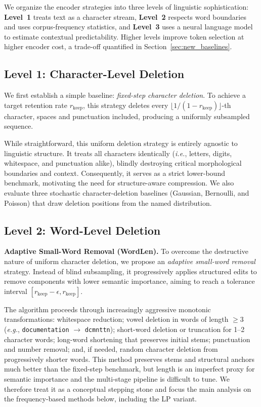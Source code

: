 \documentclass[11pt]{article}
\newcommand{\rkeep}{r_{\mathrm{keep}}}
\begin{document}
We organize the encoder strategies into three levels of linguistic sophistication: \textbf{Level~1} treats text as a character stream, \textbf{Level~2} respects word boundaries and uses corpus-frequency statistics, and \textbf{Level~3} uses a neural language model to estimate contextual predictability. Higher levels improve token selection at higher encoder cost, a trade-off quantified in Section~\ref{sec:new_baselines}.

\subsection*{Level 1: Character-Level Deletion}

\label{sec:step}
We first establish a simple baseline: \textit{fixed-step character deletion}. To achieve a target retention rate $\rkeep$, this strategy deletes every $\lfloor 1/(1-\rkeep) \rfloor$-th character, spaces and punctuation included, producing a uniformly subsampled sequence.

While straightforward, this uniform deletion strategy is entirely agnostic to linguistic structure. It treats all characters identically ({\em i.e.}, letters, digits, whitespace, and punctuation alike), blindly destroying critical morphological boundaries and context. Consequently, it serves as a strict lower-bound benchmark, motivating the need for structure-aware compression. We also evaluate three stochastic character-deletion baselines (Gaussian, Bernoulli, and Poisson) that draw deletion positions from the named distribution.

\subsection*{Level 2: Word-Level Deletion}

\textbf{Adaptive Small-Word Removal (WordLen).}
\label{sec:wordlen}
To overcome the destructive nature of uniform character deletion, we propose an \textit{adaptive small-word removal} strategy. Instead of blind subsampling, it progressively applies structured edits to remove components with lower semantic importance, aiming to reach a tolerance interval $[\rkeep - \epsilon, \rkeep]$.

The algorithm proceeds through increasingly aggressive monotonic transformations: whitespace reduction; vowel deletion in words of length $\ge 3$ ({\em e.g.}, \texttt{documentation} $\to$ \texttt{dcmnttn}); short-word deletion or truncation for 1--2 character words; long-word shortening that preserves initial stems; punctuation and number removal; and, if needed, random character deletion from progressively shorter words. This method preserves stems and structural anchors much better than the fixed-step benchmark, but length is an imperfect proxy for semantic importance and the multi-stage pipeline is difficult to tune. We therefore treat it as a conceptual stepping stone and focus the main analysis on the frequency-based methods below, including the LP variant.
\end{document}
